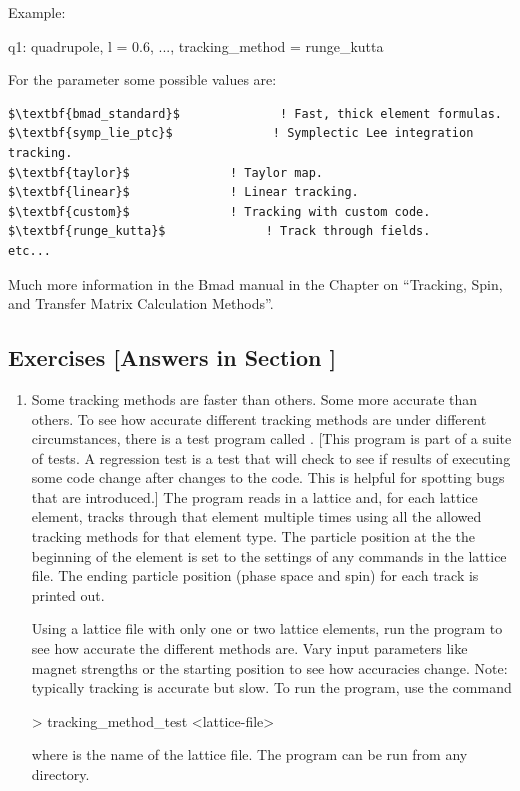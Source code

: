 \documentclass{hitec}     %
\begin{document}
Example:
\begin{code}
q1: quadrupole, l = 0.6, ..., tracking_method = runge_kutta
\end{code}

For the  parameter some possible values are:
\begin{lstlisting}[mathescape]
$\textbf{bmad_standard}$              ! Fast, thick element formulas.
$\textbf{symp_lie_ptc}$              ! Symplectic Lee integration tracking.
$\textbf{taylor}$              ! Taylor map.
$\textbf{linear}$              ! Linear tracking.
$\textbf{custom}$              ! Tracking with custom code.
$\textbf{runge_kutta}$              ! Track through fields.
etc...
\end{lstlisting}

Much more information in the Bmad manual in the Chapter on ``Tracking, Spin, and Transfer Matrix
Calculation Methods''.

\subsection{Exercises [Answers in Section ]}
\label{s:methods.ex}

\begin{enumerate}[label=\thesection.\arabic{enumi}]
\item
Some tracking methods are faster than others. Some more accurate than others. To see how accurate
different tracking methods are under different circumstances, there is a test program called
. [This program is part of a suite of  tests. A regression
test is a test that will check to see if results of executing some code change after changes to the
code. This is helpful for spotting bugs that are introduced.] The  program
reads in a lattice and, for each lattice element, tracks through that element multiple times using
all the allowed tracking methods for that element type. The particle position at the the beginning
of the element is set to the settings of any  commands in the lattice file. The
ending particle position (phase space and spin) for each track is printed out.

Using a lattice file with only one or two lattice elements, run the 
program to see how accurate the different methods are. Vary input parameters like magnet strengths
or the starting position to see how accuracies change. Note: typically  tracking is
accurate but slow. To run the program, use the command
\begin{code}
  > tracking_method_test <lattice-file>
\end{code}
where  is the name of the lattice file. The program can be run from any directory.

\end{enumerate}
\end{document}
